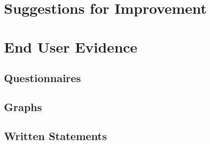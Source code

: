 \section{Suggestions for Improvement}

\section{End User Evidence}

\subsection{Questionnaires}

\subsection{Graphs}

\subsection{Written Statements}
